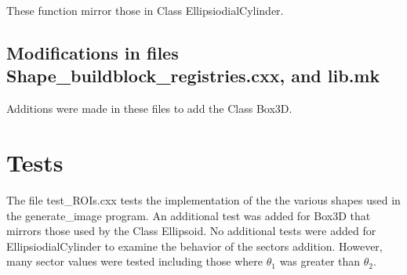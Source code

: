 \documentclass[10pt]{article}
\begin{document}
These function mirror those in Class EllipsiodialCylinder. 

\subsection{Modifications in files Shape\_buildblock\_registries.cxx, and lib.mk}

Additions were made in these files to add the Class Box3D.

\section{Tests}

The file test\_ROIs.cxx tests the implementation of the the various shapes used in the generate\_image program.  An additional test was added for Box3D that mirrors those used by the Class Ellipsoid. No additional tests were added for EllipsiodialCylinder to examine the behavior of the sectors addition.  However, many sector values were tested including those where $\theta_1$ was greater than $\theta_2$.
\end{document}
